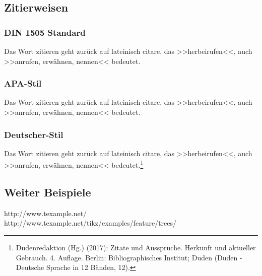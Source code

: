 \subsection{Zitierweisen}
\normalsize

\subsubsection{DIN 1505 Standard}
\glqq Das Wort zitieren geht zurück auf lateinisch citare, das >>herbeirufen<<, auch >>anrufen, erwähnen, nennen<< bedeutet.\grqq [Dud17]

\subsubsection{APA-Stil}
\glqq Das Wort zitieren geht zurück auf lateinisch citare, das >>herbeirufen<<, auch >>anrufen, erwähnen, nennen<< bedeutet.\grqq [Dudenredaktion.2017]

\subsubsection{Deutscher-Stil}
\glqq Das Wort zitieren geht zurück auf lateinisch citare, das >>herbeirufen<<, auch >>anrufen, erwähnen, nennen<< bedeutet.\grqq\footnote{Dudenredaktion (Hg.) (2017): Zitate und Aussprüche. Herkunft und aktueller Gebrauch. 4. Auflage. Berlin: Bibliographisches Institut; Duden (Duden - Deutsche Sprache in 12 Bänden, 12).}

\subsection{Weiter Beispiele}
http://www.texample.net/\\
http://www.texample.net/tikz/examples/feature/trees/